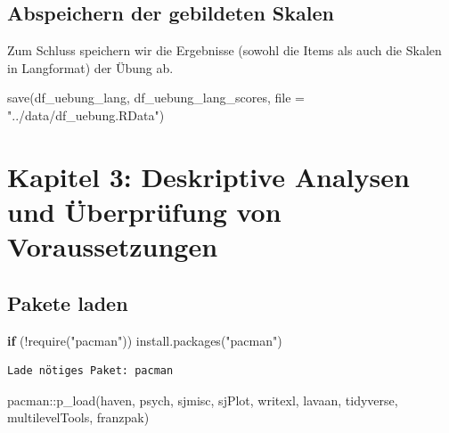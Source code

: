 \documentclass[
  letterpaper,
  DIV=11,
  numbers=noendperiod]{scrreprt}
\newenvironment{Shaded}{\begin{snugshade}}{\end{snugshade}}
\newcommand{\AttributeTok}[1]{\textcolor[rgb]{0.40,0.45,0.13}{#1}}
\newcommand{\ControlFlowTok}[1]{\textcolor[rgb]{0.00,0.23,0.31}{\textbf{#1}}}
\newcommand{\FunctionTok}[1]{\textcolor[rgb]{0.28,0.35,0.67}{#1}}
\newcommand{\NormalTok}[1]{\textcolor[rgb]{0.00,0.23,0.31}{#1}}
\newcommand{\SpecialCharTok}[1]{\textcolor[rgb]{0.37,0.37,0.37}{#1}}
\newcommand{\StringTok}[1]{\textcolor[rgb]{0.13,0.47,0.30}{#1}}
\begin{document}
\section{Abspeichern der gebildeten
Skalen}\label{abspeichern-der-gebildeten-skalen}

Zum Schluss speichern wir die Ergebnisse (sowohl die Items als auch die
Skalen in Langformat) der Übung ab.

\begin{Shaded}
\begin{Highlighting}[]
\FunctionTok{save}\NormalTok{(df\_uebung\_lang, df\_uebung\_lang\_scores, }\AttributeTok{file =} \StringTok{"../data/df\_uebung.RData"}\NormalTok{)}
\end{Highlighting}
\end{Shaded}


\chapter{Kapitel 3: Deskriptive Analysen und Überprüfung von
Voraussetzungen}\label{kapitel-3-deskriptive-analysen-und-uxfcberpruxfcfung-von-voraussetzungen}

\section{Pakete laden}\label{pakete-laden}

\begin{Shaded}
\begin{Highlighting}[]
\ControlFlowTok{if}\NormalTok{ (}\SpecialCharTok{!}\FunctionTok{require}\NormalTok{(}\StringTok{"pacman"}\NormalTok{)) }\FunctionTok{install.packages}\NormalTok{(}\StringTok{"pacman"}\NormalTok{)}
\end{Highlighting}
\end{Shaded}

\begin{verbatim}
Lade nötiges Paket: pacman
\end{verbatim}

\begin{Shaded}
\begin{Highlighting}[]
\NormalTok{pacman}\SpecialCharTok{::}\FunctionTok{p\_load}\NormalTok{(haven, psych,}
\NormalTok{               sjmisc, sjPlot, writexl, lavaan,}
\NormalTok{               tidyverse, multilevelTools, franzpak)}
\end{Highlighting}
\end{Shaded}
\end{document}

